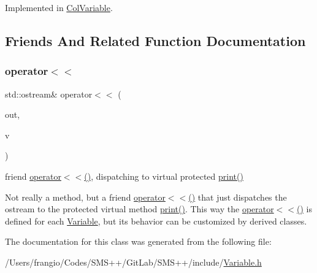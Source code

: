 Implemented in \mbox{\hyperlink{class_s_m_spp__di__unipi__it_1_1_col_variable_a758f9e908f6d1156e1a16eacaee9a586}{Col\+Variable}}.



\subsection{Friends And Related Function Documentation}
\mbox{\label{class_s_m_spp__di__unipi__it_1_1_variable_a18ae89d67d3eb2df1392ec86afe3eeb1}} 
\subsubsection{\texorpdfstring{operator$<$$<$}{operator<<}}
{\footnotesize\ttfamily std\+::ostream\& operator$<$$<$ (\begin{DoxyParamCaption}\item[{std\+::ostream \&}]{out,  }\item[{const \mbox{\hyperlink{class_s_m_spp__di__unipi__it_1_1_variable}{Variable}} \&}]{v }\end{DoxyParamCaption})\hspace{0.3cm}{\ttfamily [friend]}}



friend \mbox{\hyperlink{class_s_m_spp__di__unipi__it_1_1_variable_a18ae89d67d3eb2df1392ec86afe3eeb1}{operator$<$$<$()}}, dispatching to virtual protected \mbox{\hyperlink{class_s_m_spp__di__unipi__it_1_1_variable_a2e7b9c9148a98c5c342e8c25cac95926}{print()}} 

Not really a method, but a friend \mbox{\hyperlink{class_s_m_spp__di__unipi__it_1_1_variable_a18ae89d67d3eb2df1392ec86afe3eeb1}{operator$<$$<$()}} that just dispatches the ostream to the protected virtual method \mbox{\hyperlink{class_s_m_spp__di__unipi__it_1_1_variable_a2e7b9c9148a98c5c342e8c25cac95926}{print()}}. This way the \mbox{\hyperlink{class_s_m_spp__di__unipi__it_1_1_variable_a18ae89d67d3eb2df1392ec86afe3eeb1}{operator$<$$<$()}} is defined for each \mbox{\hyperlink{class_s_m_spp__di__unipi__it_1_1_variable}{Variable}}, but its behavior can be customized by derived classes. 

The documentation for this class was generated from the following file\+:\begin{DoxyCompactItemize}
\item 
/\+Users/frangio/\+Codes/\+S\+M\+S++/\+Git\+Lab/\+S\+M\+S++/include/\mbox{\hyperlink{_variable_8h}{Variable.\+h}}\end{DoxyCompactItemize}
